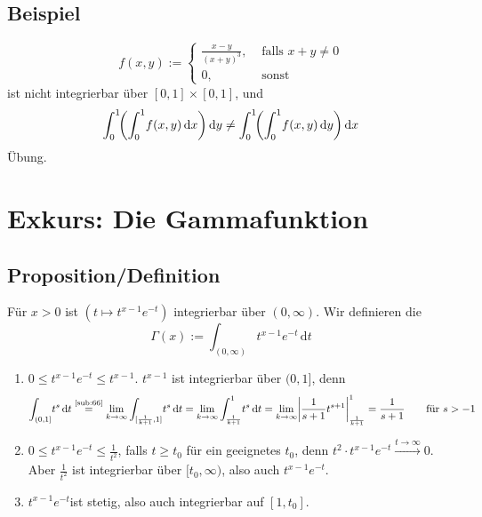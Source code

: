 \subsection[Beispiel: Anwendung von Fubini]{Beispiel} %
\label{sub:75}
\[
	f(x,y) := \begin{cases}
		\frac{x-y}{(x+y)^3} , &\text{ falls }x+y\not= 0\\
		0 ,&\text{ sonst } 
	\end{cases}
\]
ist nicht integrierbar über $[0,1] \times [0,1]$, und 
\[
	\int_{0} ^{1} \! \enbrace*{ \int_{0} ^{1} \! f(x,y)  \, \mathrm{d}x }  \, \mathrm{d}y \not= \int_{0} ^{1} \! \enbrace*{\int_{0} ^{1} \! f(x,y)  \, \mathrm{d}y}  \, \mathrm{d}x   
\]
Übung.

\section*{Exkurs: Die Gammafunktion} %
\label{sec:exkurs_die_gammafunktion}


\subsection[Proposition/Definition: Die Gamma-Funktion]{Proposition/Definition} %
\label{sub:76}
Für $x>0$ ist $(t \mapsto t^{x-1} e^{-t})$ integrierbar über $(0,\infty)$. Wir definieren die  
\[
	\Gamma(x) := \int_{(0,\infty)} \! t^{x-1} e^{-t}  \, \mathrm{d}t
\]
\begin{enumerate}[1.]
	\item $0 \le t^{x-1} e^{-t}\le t^{x-1}$. $t^{x-1}$ ist integrierbar über $(0,1]$, denn 
	\[
		\int_{(0,1]}\! t^s  \, \mathrm{d}t \stackrel{\text{\ref{sub:66}}}{=} \lim_{ k \to \infty} \int_{[\frac{1}{k+1},1 ]} \! t^s  \, \mathrm{d}t
		= \lim_{ k \to \infty} \int_{\frac{1}{k+1} } ^{1} \! t^s  \, \mathrm{d}t = \lim_{ k \to \infty}  \abs*{\frac{1}{s+1} t^{s+1} }_{\frac{1}{k+1} }^{1}
		= \frac{1}{s+1} \tag*{für $s>-1$}  
	\]
	\item $0\le t^{x-1} e^{-t} \le \frac{1}{t^2} $, falls $t\ge t_0$ für ein geeignetes $t_0$, denn $t^2 \cdot t^{x-1} e^{-t} \xrightarrow{t \to \infty} 0$. Aber 
	$\frac{1}{t^2} $ ist integrierbar über $[t_0, \infty)$, also auch $t^{x-1} e^{-t}$.
	\item $t^{x-1} e^{-t}$ist stetig, also auch integrierbar auf $[1,t_0]$. \bewende
\end{enumerate}


